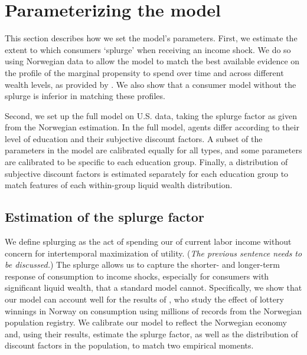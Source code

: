 \documentclass[\econtexRoot/HAFiscal]{subfiles}
\begin{document}
\hypertarget{parameterizing-the-model}{}\par\section{Parameterizing the model}

This section describes how we set the model's parameters. First, we estimate the extent to which consumers `splurge' when receiving an income shock. We do so using Norwegian data to allow the model to match the best available evidence on the profile of the marginal propensity to spend over time and across different wealth levels, as provided by \citet{fagereng_mpc_2021}. We also show that a consumer model without the splurge is inferior in matching these profiles.

Second, we set up the full model on U.S. data, taking the splurge factor as given from the Norwegian estimation. In the full model, agents differ according to their level of education and their subjective discount factors. A subset of the parameters in the model are calibrated equally for all types, and some parameters are calibrated to be specific to each education group. Finally, a distribution of subjective discount factors is estimated separately for each education group to match features of each within-group liquid wealth distribution. 

\hypertarget{estimation-of-the-splurge-factor}{}\par\subsection{Estimation of the splurge factor}
\notinsubfile{\label{sec:splurge}}

We define splurging as the act of spending our of current labor income without concern for intertemporal maximization of utility. (\textit{The previous sentence needs to be discussed.}) The splurge allows us to capture the shorter- and longer-term response of consumption to income shocks, especially for consumers with significant liquid wealth, that a standard model cannot. Specifically, we show that our model can account well for the results of \citet{fagereng_mpc_2021}, who study the effect of lottery winnings in Norway on consumption using millions of records from the Norwegian population registry. We calibrate our model to reflect the Norwegian economy and, using their results, estimate the splurge factor, as well as the distribution of discount factors in the population, to match two empirical moments. 
\end{document}
